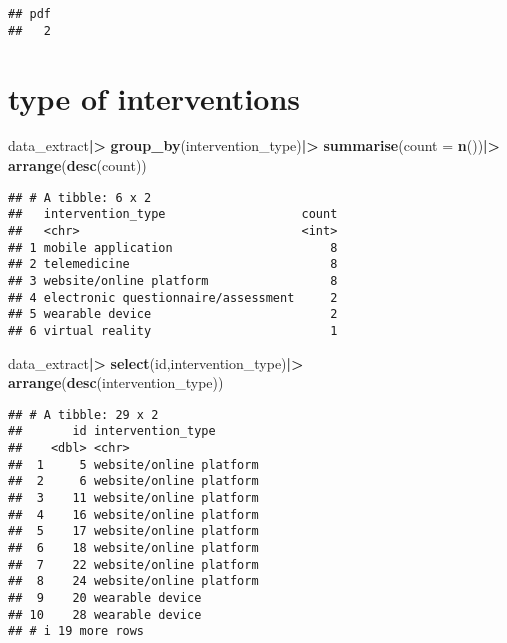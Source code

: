 \documentclass[
]{article}
\newenvironment{Shaded}{\begin{snugshade}}{\end{snugshade}}
\newcommand{\AttributeTok}[1]{\textcolor[rgb]{0.13,0.29,0.53}{#1}}
\newcommand{\FunctionTok}[1]{\textcolor[rgb]{0.13,0.29,0.53}{\textbf{#1}}}
\newcommand{\NormalTok}[1]{#1}
\newcommand{\SpecialCharTok}[1]{\textcolor[rgb]{0.81,0.36,0.00}{\textbf{#1}}}
\begin{document}
\begin{verbatim}
## pdf 
##   2
\end{verbatim}

\section{type of interventions}\label{type-of-interventions}

\begin{Shaded}
\begin{Highlighting}[]
\NormalTok{data\_extract}\SpecialCharTok{|\textgreater{}}
  \FunctionTok{group\_by}\NormalTok{(intervention\_type)}\SpecialCharTok{|\textgreater{}}
  \FunctionTok{summarise}\NormalTok{(}\AttributeTok{count =} \FunctionTok{n}\NormalTok{())}\SpecialCharTok{|\textgreater{}}
  \FunctionTok{arrange}\NormalTok{(}\FunctionTok{desc}\NormalTok{(count))}
\end{Highlighting}
\end{Shaded}

\begin{verbatim}
## # A tibble: 6 x 2
##   intervention_type                   count
##   <chr>                               <int>
## 1 mobile application                      8
## 2 telemedicine                            8
## 3 website/online platform                 8
## 4 electronic questionnaire/assessment     2
## 5 wearable device                         2
## 6 virtual reality                         1
\end{verbatim}

\begin{Shaded}
\begin{Highlighting}[]
\NormalTok{data\_extract}\SpecialCharTok{|\textgreater{}}
  \FunctionTok{select}\NormalTok{(id,intervention\_type)}\SpecialCharTok{|\textgreater{}}
  \FunctionTok{arrange}\NormalTok{(}\FunctionTok{desc}\NormalTok{(intervention\_type))}
\end{Highlighting}
\end{Shaded}

\begin{verbatim}
## # A tibble: 29 x 2
##       id intervention_type      
##    <dbl> <chr>                  
##  1     5 website/online platform
##  2     6 website/online platform
##  3    11 website/online platform
##  4    16 website/online platform
##  5    17 website/online platform
##  6    18 website/online platform
##  7    22 website/online platform
##  8    24 website/online platform
##  9    20 wearable device        
## 10    28 wearable device        
## # i 19 more rows
\end{verbatim}
\end{document}
